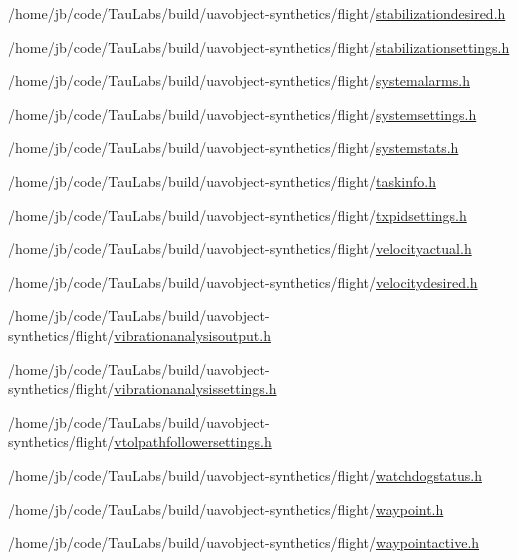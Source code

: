 \begin{DoxyCompactItemize}
/home/jb/code/\-Tau\-Labs/build/uavobject-\/synthetics/flight/\hyperlink{stabilizationdesired_8h}{stabilizationdesired.\-h}\item 
/home/jb/code/\-Tau\-Labs/build/uavobject-\/synthetics/flight/\hyperlink{stabilizationsettings_8h}{stabilizationsettings.\-h}\item 
/home/jb/code/\-Tau\-Labs/build/uavobject-\/synthetics/flight/\hyperlink{systemalarms_8h}{systemalarms.\-h}\item 
/home/jb/code/\-Tau\-Labs/build/uavobject-\/synthetics/flight/\hyperlink{systemsettings_8h}{systemsettings.\-h}\item 
/home/jb/code/\-Tau\-Labs/build/uavobject-\/synthetics/flight/\hyperlink{systemstats_8h}{systemstats.\-h}\item 
/home/jb/code/\-Tau\-Labs/build/uavobject-\/synthetics/flight/\hyperlink{taskinfo_8h}{taskinfo.\-h}\item 
/home/jb/code/\-Tau\-Labs/build/uavobject-\/synthetics/flight/\hyperlink{txpidsettings_8h}{txpidsettings.\-h}\item 
/home/jb/code/\-Tau\-Labs/build/uavobject-\/synthetics/flight/\hyperlink{velocityactual_8h}{velocityactual.\-h}\item 
/home/jb/code/\-Tau\-Labs/build/uavobject-\/synthetics/flight/\hyperlink{velocitydesired_8h}{velocitydesired.\-h}\item 
/home/jb/code/\-Tau\-Labs/build/uavobject-\/synthetics/flight/\hyperlink{vibrationanalysisoutput_8h}{vibrationanalysisoutput.\-h}\item 
/home/jb/code/\-Tau\-Labs/build/uavobject-\/synthetics/flight/\hyperlink{vibrationanalysissettings_8h}{vibrationanalysissettings.\-h}\item 
/home/jb/code/\-Tau\-Labs/build/uavobject-\/synthetics/flight/\hyperlink{vtolpathfollowersettings_8h}{vtolpathfollowersettings.\-h}\item 
/home/jb/code/\-Tau\-Labs/build/uavobject-\/synthetics/flight/\hyperlink{watchdogstatus_8h}{watchdogstatus.\-h}\item 
/home/jb/code/\-Tau\-Labs/build/uavobject-\/synthetics/flight/\hyperlink{waypoint_8h}{waypoint.\-h}\item 
/home/jb/code/\-Tau\-Labs/build/uavobject-\/synthetics/flight/\hyperlink{waypointactive_8h}{waypointactive.\-h}\end{DoxyCompactItemize}
